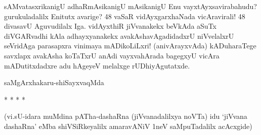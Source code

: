 sAMvatasxrikanigU adhaRmAsikanigU mAsikanigU Enu vayxtAyxsavirabahudu? gurukuladalilx Enitutx avarige? 48 vaSaR vidAyxgarxhaNada vicAravirali! 48 divasavU Aguvudilalx Iga. vidAyxthiR jiVvanakekx beVkAda aSuTx diVGARvadhi kAla adhayxyanakekx avakAshavAgadidadxrU niVvelalxrU seVridAga parasapxra vinimaya mADikoLiLxri! (anivArayxvAda) kADuharaTege savxlapx avakAsha koTaTxrU anAdi vayxvahArada bagegxyU vicAra mADutitxdadxre adu hAgeyeV melalxge rUDhiyAgutatxde. 

\bigskip

\begin{flushright}
saMgArxhakaru-shiSayxvaqMda
\end{flushright}


\begin{center}
* * * *
\end{center}

\medskip

\noindent
(vi.sU-idara muMdina pATha-dashaRna (jiVvanadalilxya noVTa) idu `jiVvana dashaRna' eMba shiVSiRkeyalilx amaravANiV 1neV saMpuTadalilx acAcxgide)
